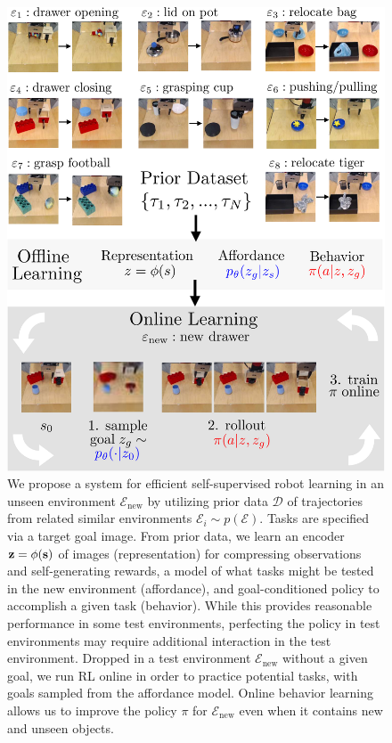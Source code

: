 \begin{figure}
\centering
  \includegraphics[width=0.7\linewidth]{val/imgs/fig_page1_v8-crop_compressed.pdf}
  \caption{\small
  We propose a system for efficient self-supervised robot learning in an unseen environment $\mathcal{E}_\text{new}$ by utilizing prior data $\mathcal{D}$ of trajectories from related similar environments $\mathcal{E}_i \sim p(\mathcal{E})$. Tasks are specified via a target goal image. From prior data, we learn an encoder $\mathbf{z} = \phi(\mathbf{s})$ of images (representation) for compressing observations and self-generating rewards, a model of what tasks might be tested in the new environment (affordance), and goal-conditioned policy to accomplish a given task (behavior). While this provides reasonable performance in some test environments, perfecting the policy in test environments may require additional interaction in the test environment. Dropped in a test environment $\mathcal{E}_\text{new}$ without a given goal, we run RL online in order to practice potential tasks, with goals sampled from the affordance model. Online behavior learning allows us to improve the policy $\pi$ for $\mathcal{E}_\text{new}$ even when it contains new and unseen objects. 
  }
  \label{fig:page1}
  \vspace{-0.5cm}
\end{figure}
